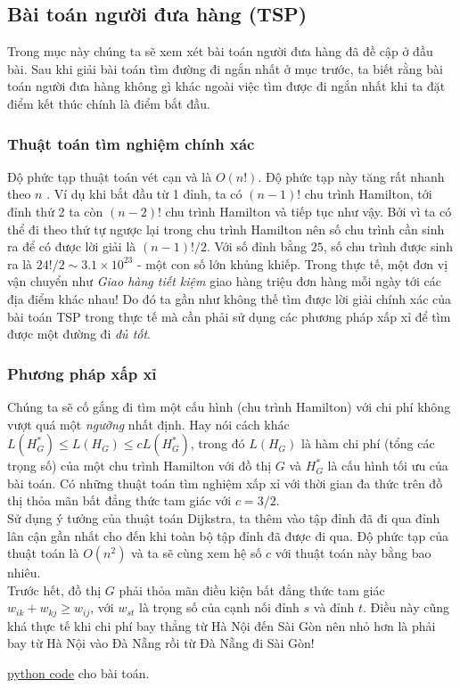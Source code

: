 
\subsection{Bài toán người đưa hàng (TSP)}
Trong mục này chúng ta sẽ xem xét bài toán người đưa hàng đã đề cập ở đầu bài.
Sau khi giải bài toán tìm đường đi ngắn nhất ở mục trước, ta biết rằng bài toán
người đưa hàng không gì khác ngoài việc tìm được đi ngắn nhất khi ta đặt điểm
kết thúc chính là điểm bắt đầu. 
\subsubsection{Thuật toán tìm nghiệm chính xác}
Độ phức tạp thuật toán vét cạn và là $O (n!)$.
Độ phức tạp này tăng rất nhanh theo $n$ . Ví dụ khi bắt đầu từ 1 đỉnh, ta có $(n-1)!$
chu trình Hamilton, tới đỉnh thứ 2 ta còn $(n-2)!$ chu trình Hamilton và tiếp tục như vậy.
Bởi vì ta có thể đi theo thứ tự ngược lại trong chu trình Hamilton nên số chu trình cần
sinh ra để có được lời giải là $(n-1)!/2$. Với số đỉnh bằng $25$, số chu trình được sinh 
ra là $24!/2 \sim 3.1 \times 10^{23}$ - một con số lớn khủng khiếp. Trong thực tế, 
một đơn vị vận chuyển như \textit{Giao hàng tiết kiệm} giao hàng triệu đơn hàng mỗi ngày 
tới các địa điểm khác nhau! Do đó ta gần như không thế tìm được lời giải chính xác của bài 
toán TSP trong thực tế mà cần phải sử dụng các phương pháp xấp xỉ để tìm được một 
đường đi \textit{đủ tốt}.

\subsubsection{Phương pháp xấp xỉ}
Chúng ta sẽ cố gắng đi tìm một cấu hình (chu trình Hamilton) với chi phí không vượt quá
một \textit{ngưỡng} nhất định. Hay nói cách khác $L(H^*_{G}) \leq L(H_{G}) \leq cL(H^*_{G})$,
trong đó $L(H_G)$ là hàm chi phí (tổng các trọng số) của một chu trình Hamilton với
đồ thị $G$ và $H^*_G$ là cấu hình tối ưu của bài toán. Có những thuật toán tìm nghiệm 
xấp xỉ với thời gian đa thức trên đồ thị thỏa mãn bất đẳng thức tam giác với $c = 3/2$. \\

Sử dụng ý tưởng của thuật toán Dijkstra, ta thêm vào tập đỉnh đã đi qua đỉnh lân cận 
gần nhất cho đến khi toàn bộ tập đỉnh đã được đi qua. Độ phức tạp của thuật toán là $O(n^2)$
và ta sẽ cùng xem hệ số $c$ với thuật toán này bằng bao nhiêu. \\

Trước hết, đồ thị $G$ phải thỏa mãn điều kiện bất đẳng thức tam giác 
$w_{ik} + w_{kj} \geq w_{ij}$, với $w_{st}$ là trọng số của cạnh nối đỉnh $s$ và đỉnh $t$.
Điều này cũng khá thực tế khi chi phí bay thẳng từ Hà Nội đến Sài Gòn nên nhỏ hơn là phải 
bay từ Hà Nội vào Đà Nẵng rồi từ Đà Nẵng đi Sài Gòn!

\href{https://github.com/batman0911/dma_homework/blob/master/hw_02/src/travelling_salesman.ipynb}{python code} 
    cho bài toán. \\